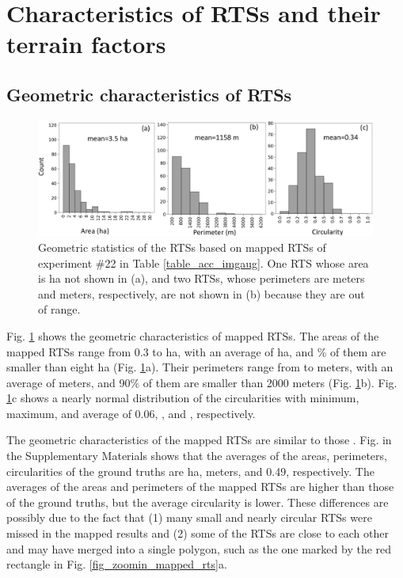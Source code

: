 \documentclass[authoryear,preprint,review,12pt]{elsarticle}
\begin{document}
\section{Characteristics of RTSs and their terrain factors}
\label{sec_spatial_terrain}


\subsection{Geometric characteristics of RTSs}
\label{subsec_geo_charac}

\begin{figure}
	\centering
	\includegraphics[width=14cm]{figures/geometric_var_mapped_trim.jpg}
	\caption{Geometric statistics of the RTSs based on mapped RTSs of experiment \#22 in Table \ref{table_acc_imgaug}. One RTS whose area is  ha not shown in (a), and two RTSs, whose perimeters are  meters and  meters, respectively, are not shown in (b) because they are out of range. }
	\label{fig_geometric_statistics}
\end{figure}


Fig. \ref{fig_geometric_statistics} shows the geometric characteristics of mapped RTSs.  The areas of the mapped RTSs range from 0.3 to  ha, with an average of  ha, and \% of them are smaller than eight ha (Fig. \ref{fig_geometric_statistics}a). Their perimeters range from  to  meters, with an average of  meters, and 90\% of them are smaller than 2000 meters  (Fig. \ref{fig_geometric_statistics}b). Fig. \ref{fig_geometric_statistics}c shows a nearly normal distribution of the circularities with minimum, maximum, and average of 0.06, , and , respectively. 

The geometric characteristics of the mapped RTSs are similar to those . Fig.  in the Supplementary Materials shows that the averages of the areas, perimeters, circularities of the ground truths 
 are  ha,  meters, and 0.49, respectively. The averages of the areas and perimeters of the mapped RTSs are higher than those of the ground truths, but the average circularity is lower. These differences are possibly due to the fact that (1) many small and nearly circular RTSs were missed in the mapped results and (2) some of the RTSs are close to each other and may have merged into a single polygon, such as the one marked by the red rectangle in Fig. \ref{fig_zoomin_mapped_rts}a.  
\end{document}
